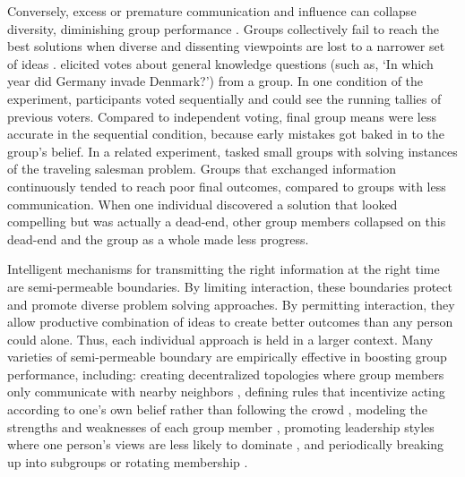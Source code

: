 \documentclass[12pt]{article}
\begin{document}
Conversely, excess or premature communication and influence can collapse diversity, diminishing group performance \citep{surowiecki2005wisdom, hogarth1978note, ladha1992condorcet, hong2004groups}. Groups collectively fail to reach the best solutions when diverse and dissenting viewpoints are lost to a narrower set of ideas \citep{anderson1997information, stasser1985pooling, flowers1977laboratory, becker2017network, janis1972victims, bernstein2018intermittent, diehl1987productivity, frey2021social}. \cite{frey2021social} elicited votes about general knowledge questions (such as, `In which year did Germany invade Denmark?') from a group. In one condition of the experiment, participants voted sequentially and could see the running tallies of previous voters. Compared to independent voting, final group means were less accurate in the sequential condition, because early mistakes got baked in to the group's belief. In a related experiment, \cite{bernstein2018intermittent} tasked small groups with solving instances of the traveling salesman problem. Groups that exchanged information continuously tended to reach poor final outcomes, compared to groups with less communication. When one individual discovered a solution that looked compelling but was actually a dead-end, other group members collapsed on this dead-end and the group as a whole made less progress. 

Intelligent mechanisms for transmitting the right information at the right time are semi-permeable boundaries. By limiting interaction, these boundaries protect and promote diverse problem solving approaches. By permitting interaction, they allow productive combination of ideas to create better outcomes than any person could alone. Thus, each individual approach is held in a larger context. Many varieties of semi-permeable boundary are empirically effective in boosting group performance, including: creating decentralized topologies where group members only communicate with nearby neighbors \citep{becker2017network, mason2008propagation}, defining rules that incentivize acting according to one's own belief rather than following the crowd \citep{hung2001information, bazazi2019self}, modeling the strengths and weaknesses of each group member \citep{welinder2010multidimensional}, promoting leadership styles where one person's views are less likely to dominate \citep{flowers1977laboratory, leana1985partial}, and periodically breaking up into subgroups or rotating membership \citep{hauer2021science, trainer2020team, straus2011group, feldman1994whos, kane2005knowledge, wu2022membership, vafeas2003length, bebchuk2005costs, baron2005so}. 
\end{document}
